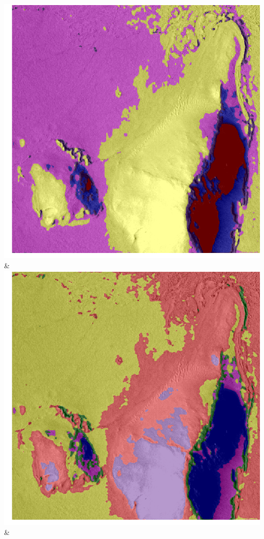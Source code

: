 \begin{table}[h!]
\begin{tabularx}{\textwidth}
		\includegraphics[width=0.9\linewidth]{images/gen/convolution_number/p03_04.png_3.png} &
		\includegraphics[width=0.9\linewidth]{images/gen/convolution_number/p03_04.png_4.png} &

\end{tabularx}
\end{table}
